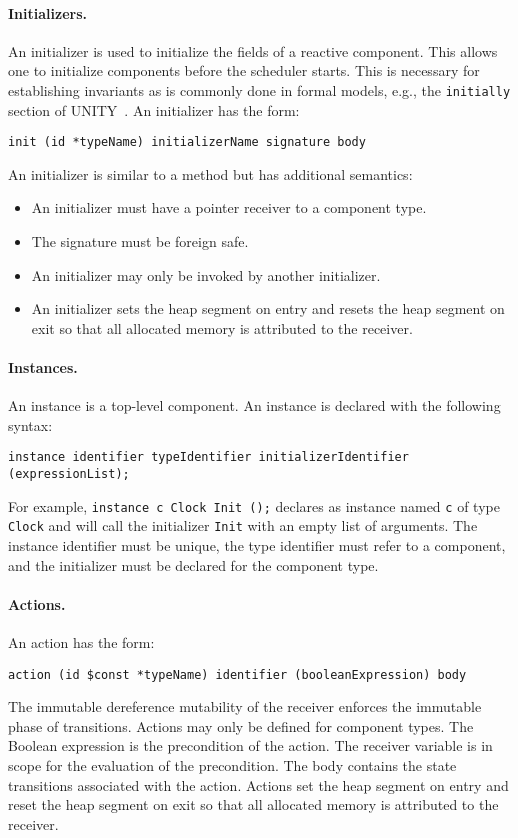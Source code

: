 \paragraph{Initializers.}
An initializer is used to initialize the fields of a reactive component.
This allows one to initialize components before the scheduler starts.
This is necessary for establishing invariants as is commonly done in formal models, e.g., the \verb+initially+ section of UNITY~\cite{chandy1989parallel}.
An initializer has the form:
\begin{verbatim}
init (id *typeName) initializerName signature body
\end{verbatim}
An initializer is similar to a method but has additional semantics:
\begin{itemize}
\item An initializer must have a pointer receiver to a component type.
\item The signature must be foreign safe.
\item An initializer may only be invoked by another initializer.
\item An initializer sets the heap segment on entry and resets the heap segment on exit so that all allocated memory is attributed to the receiver.
\end{itemize}

\paragraph{Instances.}
An instance is a top-level component.
An instance is declared with the following syntax:
\begin{verbatim}
instance identifier typeIdentifier initializerIdentifier (expressionList);
\end{verbatim}
For example, \verb+instance c Clock Init ();+ declares as instance named \verb+c+ of type \verb+Clock+ and will call the initializer \verb+Init+ with an empty list of arguments.
The instance identifier must be unique, the type identifier must refer to a component, and the initializer must be declared for the component type.

\paragraph{Actions.}
An action has the form:
\begin{verbatim}
action (id $const *typeName) identifier (booleanExpression) body
\end{verbatim}
The immutable dereference mutability of the receiver enforces the immutable phase of transitions.
Actions may only be defined for component types.
The Boolean expression is the precondition of the action.
The receiver variable is in scope for the evaluation of the precondition.
The body contains the state transitions associated with the action.
Actions set the heap segment on entry and reset the heap segment on exit so that all allocated memory is attributed to the receiver.

